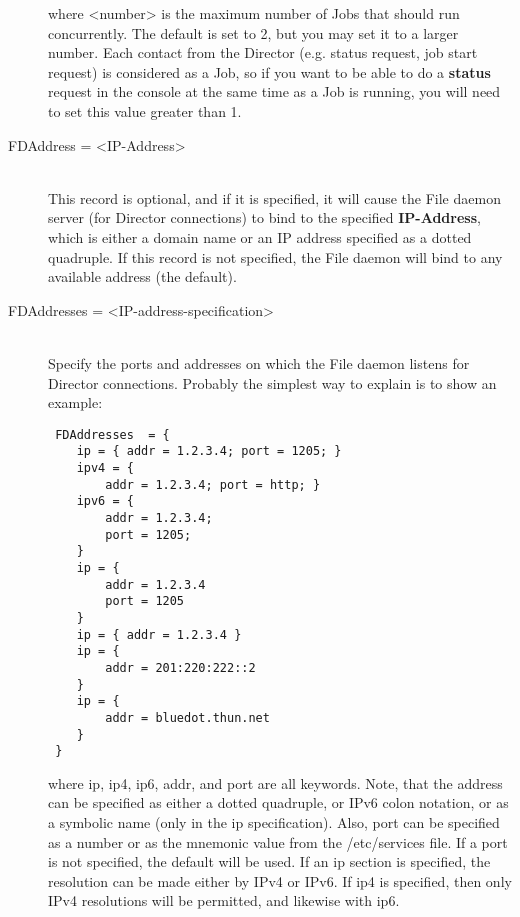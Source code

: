 \begin{description}
where {\textless}number{\textgreater} is the maximum number of Jobs that should run
concurrently.  The default is set to 2, but you may set it to a larger
number.  Each contact from the Director (e.g.  status request, job start
request) is considered as a Job, so if you want to be able to do a {\bf
status} request in the console at the same time as a Job is running, you
will need to set this value greater than 1.


\item [FDAddress = {\textless}IP-Address{\textgreater}] \hfill \\
This record is optional,  and if it is specified, it will cause the File
daemon server (for  Director connections) to bind to the specified {\bf
IP-Address},  which is either a domain name or an IP address specified as a
dotted quadruple. If this record is not specified, the File daemon  will bind
to any available address (the default).


\item [FDAddresses = {\textless}IP-address-specification{\textgreater}] \hfill \\
Specify the ports and addresses on which the File daemon listens for
Director connections.  Probably the simplest way to explain is to show
an example:

\footnotesize
\begin{verbatim}
 FDAddresses  = {
    ip = { addr = 1.2.3.4; port = 1205; }
    ipv4 = {
        addr = 1.2.3.4; port = http; }
    ipv6 = {
        addr = 1.2.3.4;
        port = 1205;
    }
    ip = {
        addr = 1.2.3.4
        port = 1205
    }
    ip = { addr = 1.2.3.4 }
    ip = {
        addr = 201:220:222::2
    }
    ip = {
        addr = bluedot.thun.net
    }
 }
\end{verbatim}
\normalsize

where ip, ip4, ip6, addr, and port are all keywords. Note, that  the address
can be specified as either a dotted quadruple, or  IPv6 colon notation, or as
a symbolic name (only in the ip specification).  Also, port can be specified
as a number or as the mnemonic value from  the /etc/services file.  If a port
is not specified, the default will be used. If an ip  section is specified,
the resolution can be made either by IPv4 or  IPv6. If ip4 is specified, then
only IPv4 resolutions will be permitted,  and likewise with ip6.


\end{description}
